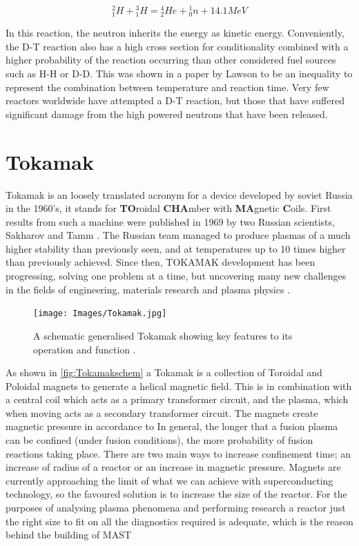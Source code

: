 \documentclass[12pt,a4paper,oneside]{report}
\begin{document}
\begin{equation}
{^{2}_{1}H} + {^{3}_{1}H} = {^{4}_{2}He} + {^{1}_{0}n} + 14.1MeV
\label{eq:D-T}
\end{equation}

In this reaction, the neutron inherits the energy as kinetic energy. Conveniently, the D-T reaction also has a high cross section for conditionality combined with a higher probability of the reaction occurring than other considered fuel sources such as H-H or D-D. This was shown in a paper by Lawson \cite{Christopherson1957SomeReactor} to be an inequality to represent the combination between temperature and reaction time. Very few reactors worldwide have attempted a D-T reaction, but those that have suffered significant damage from the high powered neutrons that have been released.

	\section{Tokamak}
Tokamak is an loosely translated acronym for a device developed by soviet Russia in the 1960's, it stands for \textbf{TO}roidal \textbf{CHA}mber with \textbf{MA}gnetic \textbf{C}oils. First results from such a machine were published in 1969 by two Russian scientists, Sakharov and Tamm \cite{Tamm1959TheoryI}. The Russian team managed to produce plasmas of a much higher stability than previously seen, and at temperatures up to 10 times higher than previously achieved. Since then, TOKAMAK development has been progressing, solving one problem at a time, but uncovering many new challenges in the fields of engineering, materials research and plasma physics \cite{Smirnov2010Tokamak19501990}.\\

\begin{figure}[H]
\texttt{[image: Images/Tokamak.jpg]}
\caption{A schematic generalised Tokamak showing key features to its operation and function \cite{TokamakEUROfusion}.}
\label{fig:Tokamakschem}
\end{figure}

As shown in \autoref{fig:Tokamakschem} a Tokamak is a collection of Toroidal and Poloidal magnets to generate a helical magnetic field. This is in combination with a central coil which acts as a primary transformer circuit, and the plasma, which when moving acts as a secondary transformer circuit. The magnets create magnetic pressure in accordance to 
In general, the longer that a fusion plasma can be confined (under fusion conditions), the more probability of fusion reactions taking place. There are two main ways to increase confinement time; an increase of radius of a reactor or an increase in magnetic pressure. Magnets are currently approaching the limit of what we can achieve with superconducting technology, so the favoured solution is to increase the size of the reactor. For the purposes of analysing plasma phenomena and performing research a reactor just the right size to fit on all the diagnostics required is adequate, which is the reason behind the building of MAST \cite{Chapman2015OverviewResults}\\
\end{document}
